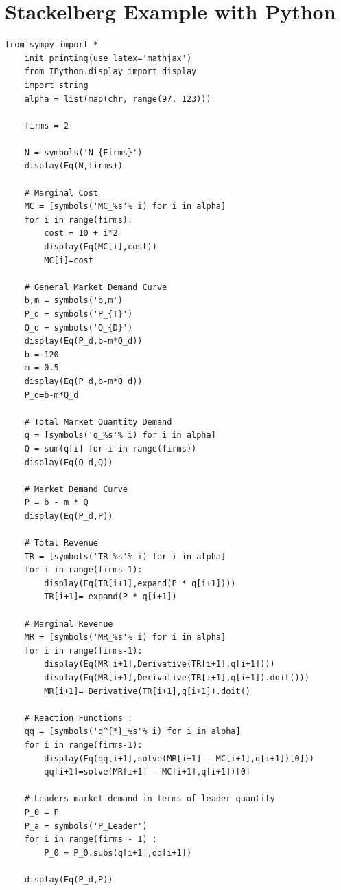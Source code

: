\documentclass[phd, 12pt, print]{fauthesis}
\begin{document}
\section{Stackelberg Example with Python}
\lstset{language=python}          %
\begin{lstlisting}[frame=single]  % Start your code-block
    from sympy import * 
    init_printing(use_latex='mathjax')
    from IPython.display import display
    import string
    alpha = list(map(chr, range(97, 123)))
    
    firms = 2
    
    N = symbols('N_{Firms}')
    display(Eq(N,firms))
    
    # Marginal Cost
    MC = [symbols('MC_%s'% i) for i in alpha]
    for i in range(firms):
        cost = 10 + i*2
        display(Eq(MC[i],cost))
        MC[i]=cost
    
    # General Market Demand Curve
    b,m = symbols('b,m')
    P_d = symbols('P_{T}')
    Q_d = symbols('Q_{D}')
    display(Eq(P_d,b-m*Q_d))
    b = 120
    m = 0.5
    display(Eq(P_d,b-m*Q_d))
    P_d=b-m*Q_d
    
    # Total Market Quantity Demand
    q = [symbols('q_%s'% i) for i in alpha]
    Q = sum(q[i] for i in range(firms))
    display(Eq(Q_d,Q))
    
    # Market Demand Curve
    P = b - m * Q
    display(Eq(P_d,P))
    
    # Total Revenue
    TR = [symbols('TR_%s'% i) for i in alpha]
    for i in range(firms-1):
        display(Eq(TR[i+1],expand(P * q[i+1])))
        TR[i+1]= expand(P * q[i+1])
    
    # Marginal Revenue
    MR = [symbols('MR_%s'% i) for i in alpha]
    for i in range(firms-1):
        display(Eq(MR[i+1],Derivative(TR[i+1],q[i+1])))
        display(Eq(MR[i+1],Derivative(TR[i+1],q[i+1]).doit()))
        MR[i+1]= Derivative(TR[i+1],q[i+1]).doit()
    
    # Reaction Functions :
    qq = [symbols('q^{*}_%s'% i) for i in alpha]
    for i in range(firms-1):
        display(Eq(qq[i+1],solve(MR[i+1] - MC[i+1],q[i+1])[0]))
        qq[i+1]=solve(MR[i+1] - MC[i+1],q[i+1])[0]
    
    # Leaders market demand in terms of leader quantity
    P_0 = P 
    P_a = symbols('P_Leader')
    for i in range(firms - 1) :
        P_0 = P_0.subs(q[i+1],qq[i+1])
    
    display(Eq(P_d,P))
    

\end{lstlisting}
\end{document}

